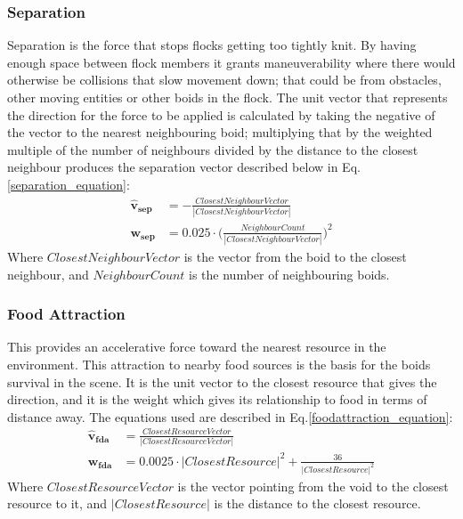 \subsubsection{Separation}
Separation is the force that stops flocks getting too tightly knit. By having enough space between flock members it grants maneuverability where there would otherwise be collisions that slow movement down; that could be from obstacles, other moving entities or other boids in the flock. The unit vector that represents the direction for the force to be applied is calculated by taking the negative of the vector to the nearest neighbouring boid; multiplying that by the weighted multiple of the number of neighbours divided by the distance to the closest neighbour produces the separation vector described below in Eq.\ref{separation_equation}:
\begin{equation}
\begin{split}
	\boldsymbol{\hat{v}_{sep}} &= -\frac{ClosestNeighbourVector} {| ClosestNeighbourVector|} \\
	\boldsymbol{w_{sep}} &= 0.025 \cdot  \Big(\frac{NeighbourCount} {|ClosestNeighbourVector|}\Big)^2
\end{split}
\label{separation_equation}
\end{equation}
Where $ClosestNeighbourVector$ is the vector from the boid to the closest neighbour, and $NeighbourCount$ is the number of neighbouring boids.


\subsubsection{Food Attraction}
This provides an accelerative force toward the nearest resource in the environment. This attraction to nearby food sources is the basis for the boids survival in the scene. It is the unit vector to the closest resource that gives the direction, and it is the weight which gives its relationship to food in terms of distance away. The equations used are described in Eq.\ref{foodattraction_equation}:
\begin{equation}
\begin{split}
	\boldsymbol{\hat{v}_{fda}} &= \frac{ClosestResourceVector} {|ClosestResourceVector|} \\
	\boldsymbol{w_{fda}} &= 0.0025 \cdot |ClosestResource|^2 + \frac{36} {|ClosestResource|^2}
\end{split}
\label{foodattraction_equation}
\end{equation}
Where $ClosestResourceVector$ is the vector pointing from the void to the closest resource to it, and $|ClosestResource|$ is the distance to the closest resource.


